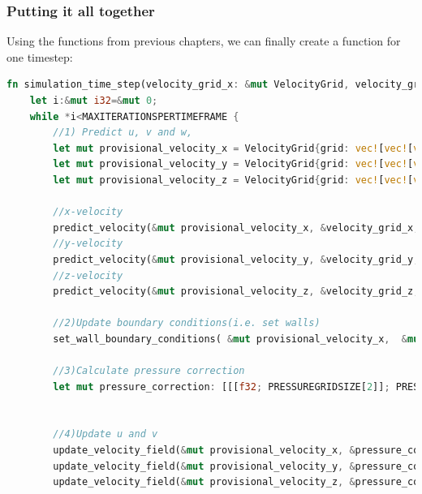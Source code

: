 \documentclass{article}
\begin{document}
\subsubsection{Putting it all together}
Using the functions from previous chapters, we can finally create a function for one timestep:
\begin{lstlisting}[language=Rust, style=boxed, breaklines=true]
fn simulation_time_step(velocity_grid_x: &mut VelocityGrid, velocity_grid_y: &mut VelocityGrid, velocity_grid_z: &mut VelocityGrid,  pressure_grid: &mut [[[f32; PRESSUREGRIDSIZE[2]];PRESSUREGRIDSIZE[1]];PRESSUREGRIDSIZE[0]], time_step: i32) -> Vec<Vec<Vec<[f32;3]>>>{
    let i:&mut i32=&mut 0;
    while *i<MAXITERATIONSPERTIMEFRAME {
        //1) Predict u, v and w,
        let mut provisional_velocity_x = VelocityGrid{grid: vec![vec![vec![0.0;PRESSUREGRIDSIZE[2]+2]; PRESSUREGRIDSIZE[1]+2]; PRESSUREGRIDSIZE[0]+1], dimension:0};
        let mut provisional_velocity_y = VelocityGrid{grid: vec![vec![vec![0.0;PRESSUREGRIDSIZE[2]+2]; PRESSUREGRIDSIZE[1]+1]; PRESSUREGRIDSIZE[0]+2], dimension:1}; 
        let mut provisional_velocity_z = VelocityGrid{grid: vec![vec![vec![0.0;PRESSUREGRIDSIZE[2]+1]; PRESSUREGRIDSIZE[1]+2]; PRESSUREGRIDSIZE[0]+2], dimension:2}; 
    
        //x-velocity
        predict_velocity(&mut provisional_velocity_x, &velocity_grid_x, &velocity_grid_y, &velocity_grid_z, *pressure_grid);
        //y-velocity
        predict_velocity(&mut provisional_velocity_y, &velocity_grid_y, &velocity_grid_x, &velocity_grid_z, *pressure_grid);
        //z-velocity
        predict_velocity(&mut provisional_velocity_z, &velocity_grid_z, &velocity_grid_x, &velocity_grid_y, *pressure_grid);
        
        //2)Update boundary conditions(i.e. set walls)
        set_wall_boundary_conditions( &mut provisional_velocity_x,  &mut provisional_velocity_y,  &mut provisional_velocity_z, 1.0, time_step);

        //3)Calculate pressure correction
        let mut pressure_correction: [[[f32; PRESSUREGRIDSIZE[2]]; PRESSUREGRIDSIZE[1]]; PRESSUREGRIDSIZE[0]]=calculate_pressure_correction(&provisional_velocity_x, &provisional_velocity_y, &provisional_velocity_z);
    

        //4)Update u and v
        update_velocity_field(&mut provisional_velocity_x, &pressure_correction);
        update_velocity_field(&mut provisional_velocity_y, &pressure_correction);
        update_velocity_field(&mut provisional_velocity_z, &pressure_correction);
        

\end{lstlisting}
\end{document}

